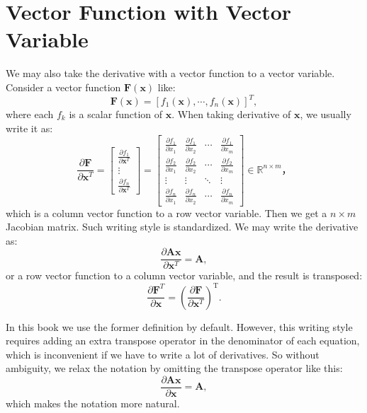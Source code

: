 \section{Vector Function with Vector Variable}
We may also take the derivative with a vector function to a vector variable. Consider a vector function $\mathbf{F}(\mathbf{x})$ like: $$\mathbf{F}(\mathbf{x}) = [f_1(\mathbf{x}), \cdots, f_n(\mathbf{x})]^T,$$ where each $f_k$ is a scalar function of $\mathbf{x}$. When taking derivative of $\mathbf{x}$, we usually write it as: 
\begin{equation}
	\frac{{\partial \mathbf{F}}}{{\partial {\mathbf{x}^T}}} = \left[ {\begin{array}{*{20}{c}}
			{\frac{{\partial {f_1}}}{{\partial {\mathbf{x}^T}}}}\\
			\vdots \\
			{\frac{{\partial {f_n}}}{{\partial {\mathbf{x}^T}}}}
	\end{array}} \right] = \left[ {\begin{array}{*{20}{c}}
			{\frac{{\partial {f_1}}}{{\partial {x_1}}}}&{\frac{{\partial {f_1}}}{{\partial {x_2}}}}& \cdots &{\frac{{\partial {f_1}}}{{\partial {x_m}}}}\\
			{\frac{{\partial {f_2}}}{{\partial {x_1}}}}&{\frac{{\partial {f_2}}}{{\partial {x_2}}}}& \cdots &{\frac{{\partial {f_2}}}{{\partial {x_m}}}}\\
			\vdots & \vdots & \ddots & \vdots \\
			{\frac{{\partial {f_n}}}{{\partial {x_1}}}}&{\frac{{\partial {f_n}}}{{\partial {x_2}}}}& \cdots &{\frac{{\partial {f_n}}}{{\partial {x_m}}}}
	\end{array}} \right] \in {\mathbb{R}^{n \times m}}，
\end{equation}
which is a column vector function to a row vector variable. Then we get a $n \times m$ Jacobian matrix. Such writing style is standardized. We may write the derivative as: 
\begin{equation}
	\frac{\partial \mathbf{Ax}} {\partial\mathbf{x}^T} = \mathbf{A},
\end{equation}
or a row vector function to a column vector variable, and the result is transposed: 
\begin{equation}
	\frac{{\partial \mathbf{F}}^T}{{\partial {\mathbf{x}}}}  = \left(\frac{{\partial \mathbf{F}}}{{\partial {\mathbf{x}^T}}} \right)^ \mathrm{T}.
\end{equation}

In this book we use the former definition by default. However, this writing style requires adding an extra transpose operator in the denominator of each equation, which is inconvenient if we have to write a lot of derivatives. So without ambiguity, we relax the notation by omitting the transpose operator like this: 
\begin{equation}
	\frac{\partial \mathbf{Ax}} {\partial\mathbf{x}} = \mathbf{A},
\end{equation}
which makes the notation more natural. 
